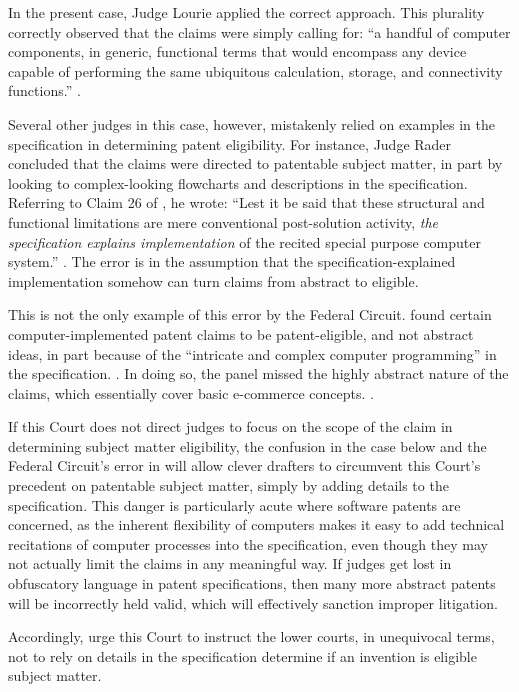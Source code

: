 \documentclass{scotus}
\begin{document}
In the present case, Judge Lourie applied the correct approach. This plurality
correctly observed that the claims were simply calling for: ``a handful of
computer components, in generic, functional terms that would encompass any
device capable of performing the same ubiquitous calculation, storage, and
connectivity functions.'' .

Several other judges in this case, however, mistakenly relied on examples in the
specification in determining patent eligibility.
For instance, Judge Rader concluded that the claims
were directed to patentable subject matter, in part by looking to
complex-looking flowcharts and descriptions in the specification. Referring to
Claim 26 of , he wrote: ``Lest it be
said that these structural and functional limitations are
mere conventional post-solution activity, \emph{the specification explains
implementation} of the recited special purpose computer system.''
. The error is in the assumption
that the specification-explained implementation somehow can turn claims from
abstract to eligible.

This is not the only example of this error by the Federal Circuit.
 found certain
computer-implemented patent claims to be patent-eligible, and not abstract
ideas, in part because of the ``intricate and complex computer programming''
in the specification. . In doing so, the panel missed the
highly abstract nature of the claims, which essentially cover basic e-commerce
concepts. .

If this Court does not direct judges to focus on the scope of the
claim in determining subject matter eligibility, the confusion in the case below
and the Federal Circuit's error in  will allow clever
drafters to circumvent this Court's precedent on patentable subject matter,
simply by adding details to the specification. This danger is particularly acute
where software patents are concerned, as the inherent flexibility of computers
makes it easy to add technical recitations of computer processes into the
specification, even though they may not actually limit the claims in any
meaningful way.  If judges get lost in obfuscatory language in patent
specifications, then many more abstract patents will be incorrectly held valid,
which will effectively sanction improper litigation.

Accordingly, \amici urge this Court to instruct the lower courts, in unequivocal
terms, not to rely on details in the specification determine if an
invention is eligible subject matter.
\end{document}
